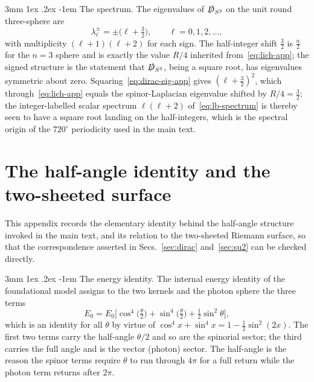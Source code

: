 \documentclass[%
 reprint, amsmath,amssymb, aps, prb, ]{revtex4-2}
\makeatletter
\numberwithin{equation}{section}
\renewcommand\paragraph{%
  \@startsection{paragraph}{4}{\z@}%
    {3mm \@plus 1ex \@minus .2ex}%
    {-1em}%
    {\normalfont\normalsize\itshape}}
\newcommand{\iphase}{\theta}  %
\newcommand{\Dslash}{\slashed{D}}
\makeatother
\begin{document}
\paragraph{The spectrum.}
The eigenvalues of $\Dslash_{S^{3}}$ on the unit round three-sphere are~\cite{Baer1996,Trautman1995}
\begin{equation}
\label{eq:dirac-eig-app}
\lambda_{\ell}^{\pm} = \pm\Big(\ell + \tfrac{3}{2}\Big),
\qquad
\ell = 0,1,2,\dots,
\end{equation}
with multiplicity $(\ell+1)(\ell+2)$ for each sign. The half-integer shift $\tfrac{3}{2}$ is $\tfrac{n}{2}$ for the $n=3$ sphere and is exactly the value $R/4$ inherited from~\eqref{eq:lich-app}; the signed structure is the statement that $\Dslash_{S^{3}}$, being a square root, has eigenvalues symmetric about zero. Squaring~\eqref{eq:dirac-eig-app} gives $(\ell+\tfrac32)^{2}$, which through~\eqref{eq:lich-app} equals the spinor-Laplacian eigenvalue shifted by $R/4=\tfrac32$; the integer-labelled scalar spectrum $\ell(\ell+2)$ of~\eqref{eq:lb-spectrum} is thereby seen to have a square root landing on the half-integers, which is the spectral origin of the $720^{\circ}$ periodicity used in the main text.

\section{The half-angle identity and the two-sheeted surface}
\label{app:halfangle}

This appendix records the elementary identity behind the half-angle structure invoked in the main text, and its relation to the two-sheeted Riemann surface, so that the correspondence asserted in Secs.~\ref{sec:dirac} and~\ref{sec:su2} can be checked directly.

\paragraph{The energy identity.}
The internal energy identity of the foundational model assigns to the two kernels and the photon sphere the three terms~\cite{hanamura01}
\begin{equation}
\label{eq:E0-app}
E_{0} = E_{0}\Big[\cos^{4}\!\big(\tfrac{\iphase}{2}\big) + \sin^{4}\!\big(\tfrac{\iphase}{2}\big) + \tfrac{1}{2}\sin^{2}\iphase\Big],
\end{equation}
which is an identity for all $\iphase$ by virtue of $\cos^{4}x+\sin^{4}x = 1-\tfrac12\sin^{2}(2x)$. The first two terms carry the half-angle $\iphase/2$ and so are the spinorial sector; the third carries the full angle and is the vector (photon) sector. The half-angle is the reason the spinor terms require $\iphase$ to run through $4\pi$ for a full return while the photon term returns after $2\pi$.
\end{document}
